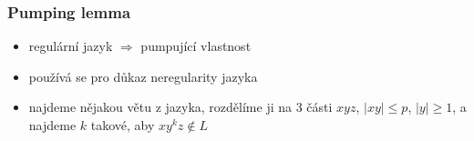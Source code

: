 \subsubsection*{Pumping lemma}
\begin{itemize}
	\item regulární jazyk $\Rightarrow$ pumpující vlastnost
	\item používá se pro důkaz neregularity jazyka
	\item najdeme nějakou větu z jazyka, rozdělíme ji na 3 části $xyz$, $|xy| \leq p$, $|y| \geq 1$, a najdeme $k$ takové, aby $xy^k z \not\in L$
\end{itemize}